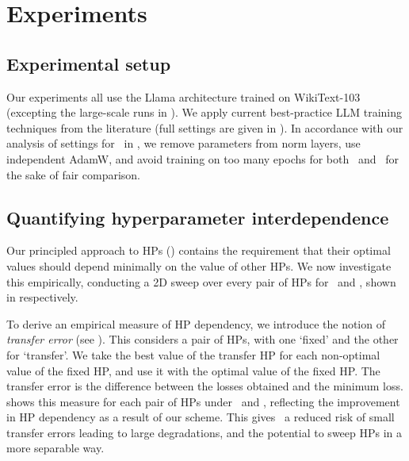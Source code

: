 \section{Experiments}

\subsection{Experimental setup}

Our experiments all use the Llama \citep{Llama} architecture trained on WikiText-103~\citep{WikiText103} (excepting the large-scale runs in ). We apply current best-practice LLM training techniques from the literature (full settings are given in ). In accordance with our analysis of settings for \mut\ in , we remove parameters from norm layers, use independent AdamW, and avoid training on too many epochs for both \umup\ and \mup\ for the sake of fair comparison.

\subsection{Quantifying hyperparameter interdependence} \label{sec:experiments:hp_independence}

Our principled approach to HPs () contains the requirement that their optimal values should depend minimally on the value of other HPs. We now investigate this empirically, conducting a 2D sweep over every pair of HPs for \mup\ and \umup, shown in  respectively.

To derive an empirical measure of HP dependency, we introduce the notion of \textit{transfer error} (see ). This considers a pair of HPs, with one `fixed' and the other for `transfer'. We take the best value of the transfer HP for each non-optimal value of the fixed HP, and use it with the optimal value of the fixed HP. The transfer error is the difference between the losses obtained and the minimum loss.  shows this measure for each pair of HPs under \mup\ and \umup, reflecting the improvement in HP dependency as a result of our scheme. This gives \umup\ a reduced risk of small transfer errors leading to large degradations, and the potential to sweep HPs in a more separable way.

